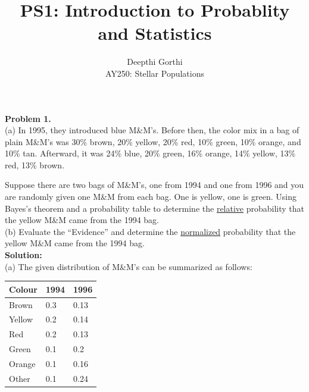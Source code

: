 \documentclass[12pt,usletter,english]{article}
\begin{document}
\title{PS1: Introduction to Probablity and Statistics} \author{Deepthi Gorthi\\ AY250: Stellar Populations} \maketitle

\noindent \textbf{Problem 1.} \\ 

(a) In 1995, they introduced blue M\&M's.  Before then, the color mix
in a bag of plain M\&M's was 30\% brown, 20\% yellow, 20\% red, 10\%
green, 10\% orange, and 10\% tan.  Afterward, it was 24\% blue, 20\%
green, 16\% orange, 14\% yellow, 13\% red, 13\% brown.

Suppose there are two bags of M\&M's, one from 1994 and one from 1996
and you are randomly given one M\&M from each bag.  One is yellow, one
is green.  Using Bayes's theorem and a probability table to determine
the \underline{relative} probability that the yellow M\&M came from
the 1994 bag. \\

(b) Evaluate the ``Evidence'' and determine the \underline{normalized}
probability that the yellow M\&M came from the 1994 bag. \\

\noindent \textbf{Solution:} \\

(a) The given distribution of M\&M's can be summarized as follows:

\begin{center}
\label{tab:mm}
\begin{tabular}{|l|l|l|}
\hline
Colour & 1994 & 1996 \\
\hline
Brown & 0.3 & 0.13 \\
\hline
Yellow & 0.2 & 0.14 \\
\hline
Red & 0.2 & 0.13 \\
\hline
Green & 0.1 & 0.2 \\
\hline
Orange & 0.1 & 0.16 \\
\hline
Other & 0.1 & 0.24 \\
\hline
\end{tabular}
\end{center}
\end{document}
